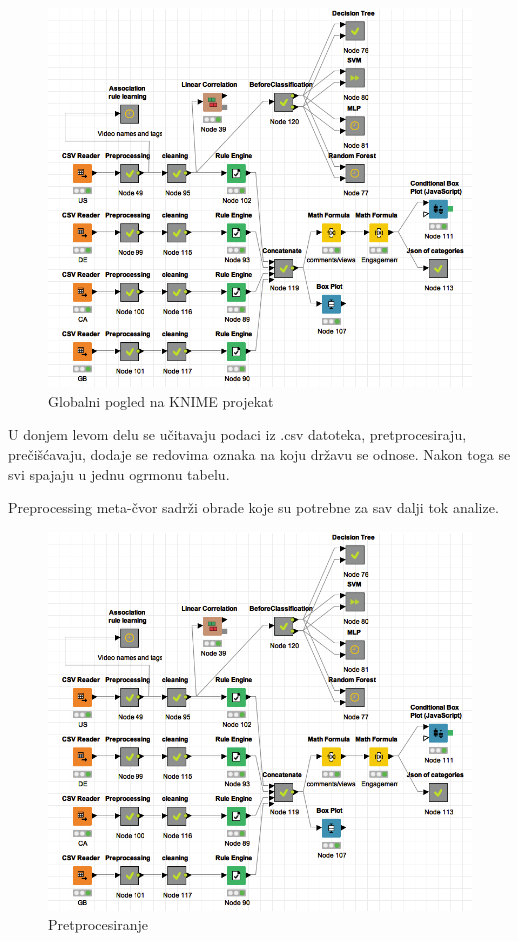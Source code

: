 \documentclass[a4paper]{article}
\theoremstyle{definition}
\begin{document}
\begin{figure}[h!]
\begin{center}
    \includegraphics[width=1\textwidth]{Global.png}
    \caption{Globalni pogled na KNIME projekat}
\end{center}
\end{figure}

U donjem levom delu se učitavaju podaci iz .csv datoteka, pretprocesiraju, prečišćavaju, dodaje se redovima oznaka na koju državu se odnose.
Nakon toga se svi spajaju u jednu ogrmonu tabelu.

Preprocessing meta-čvor sadrži obrade koje su potrebne za sav dalji tok analize.


\begin{figure}[h!]
\begin{center}
    \includegraphics[width=1\textwidth]{Global.png}
    \caption{Pretprocesiranje}
\end{center}
\end{figure}
\end{document}
